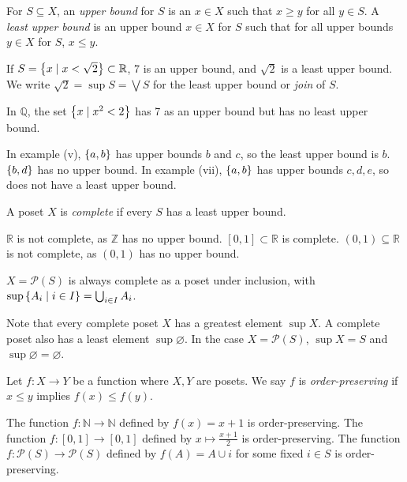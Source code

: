 \begin{definition}
    For \( S \subseteq X \), an \emph{upper bound} for \( S \) is an \( x \in X \) such that \( x \geq y \) for all \( y \in S \).
    A \emph{least upper bound} is an upper bound \( x \in X \) for \( S \) such that for all upper bounds \( y \in X \) for \( S \), \( x \leq y \).
\end{definition}
\begin{example}
    If \( S = \qty{x \mid x < \sqrt{2}} \subset \mathbb R \), 7 is an upper bound, and \( \sqrt{2} \) is a least upper bound.
    We write \( \sqrt{2} = \sup S = \bigvee S \) for the least upper bound or \emph{join} of \( S \).

    In \( \mathbb Q \), the set \( \qty{x \mid x^2 < 2} \) has 7 as an upper bound but has no least upper bound.

    In example (v), \( \qty{a, b} \) has upper bounds \( b \) and \( c \), so the least upper bound is \( b \).
    \( \qty{b, d} \) has no upper bound.
    In example (vii), \( \qty{a, b} \) has upper bounds \( c, d, e \), so does not have a least upper bound.
\end{example}
\begin{definition}
    A poset \( X \) is \emph{complete} if every \( S \) has a least upper bound.
\end{definition}
\begin{example}
    \( \mathbb R \) is not complete, as \( \mathbb Z \) has no upper bound.
    \( [0,1] \subset \mathbb R \) is complete.
    \( (0,1) \subseteq \mathbb R \) is not complete, as \( (0,1) \) has no upper bound.
\end{example}
\begin{example}
    \( X = \mathcal P(S) \) is always complete as a poset under inclusion, with \( \sup\qty{A_i \mid i \in I} = \bigcup_{i \in I} A_i \).
\end{example}
Note that every complete poset \( X \) has a greatest element \( \sup X \).
A complete poset also has a least element \( \sup \varnothing \).
In the case \( X = \mathcal P(S) \), \( \sup X = S \) and \( \sup \varnothing = \varnothing \).
\begin{definition}
    Let \( f \colon X \to Y \) be a function where \( X, Y \) are posets.
    We say \( f \) is \emph{order-preserving} if \( x \leq y \) implies \( f(x) \leq f(y) \).
\end{definition}
\begin{example}
    The function \( f \colon \mathbb N \to \mathbb N \) defined by \( f(x) = x + 1 \) is order-preserving.
    The function \( f \colon [0,1] \to [0,1] \) defined by \( x \mapsto \frac{x+1}{2} \) is order-preserving.
    The function \( f \colon \mathcal P(S) \to \mathcal P(S) \) defined by \( f(A) = A \cup \qty{i} \) for some fixed \( i \in S \) is order-preserving. 
\end{example}
